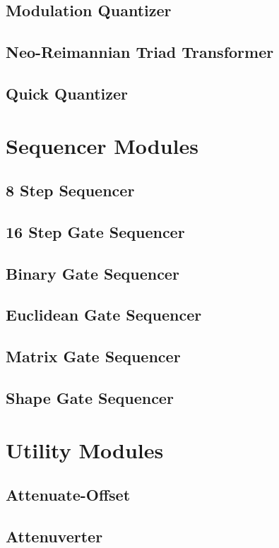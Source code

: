 \documentclass[11pt]{book}
\begin{document}
\section{Modulation Quantizer}
\pagebreak
\section{Neo-Reimannian Triad Transformer}
\pagebreak
\section{Quick Quantizer}
\pagebreak

\chapter{Sequencer Modules}
\pagebreak
\section{8 Step Sequencer}
\pagebreak
\section{16 Step Gate Sequencer}
\pagebreak
\section{Binary Gate Sequencer}
\pagebreak
\section{Euclidean Gate Sequencer}
\pagebreak
\section{Matrix Gate Sequencer}
\pagebreak
\section{Shape Gate Sequencer}
\pagebreak

\chapter{Utility Modules}
\pagebreak
\section{Attenuate-Offset}
\pagebreak
\section{Attenuverter}
\pagebreak
\end{document}
